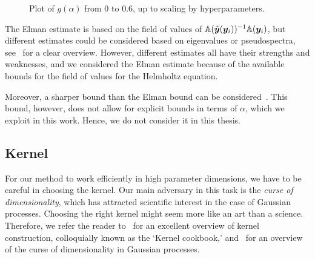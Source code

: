 \begin{figure}
    \centering
    \caption{Plot of $g(\alpha)$ from 0 to $0.6$, up to scaling by hyperparameters.}
    \label{fig:gplot}
\end{figure}

\begin{remark}
    The Elman estimate is based on the field of values of $\mathbb{A}(\hat{\bm{y}}({\bm{y}_i}))^{-1}\mathbb{A}({\bm{y}_i})$, but different estimates could be considered based on eigenvalues or pseudospectra, see~\cite{embree1999} for a clear overview.
    However, different estimates all have their strengths and weaknesses, and we considered the Elman estimate because of the available bounds for the field of values for the Helmholtz equation.

    Moreover, a sharper bound than the Elman bound can be considered~\cite{beckermann2005}.
    This bound, however, does not allow for explicit bounds in terms of $\alpha$, which we exploit in this work.
    Hence, we do not consider it in this thesis.
\end{remark}


\subsection{Kernel}\label{subsec:kernel}
For our method to work efficiently in high parameter dimensions, we have to be careful in choosing the kernel.
Our main adversary in this task is the \emph{curse of dimensionality}, which has attracted scientific interest in the case of Gaussian processes.
Choosing the right kernel might seem more like an art than a science.
Therefore, we refer the reader to~\cite[Chapter 2]{duvenaud2014} for an excellent overview of kernel construction, colloquially known as the `Kernel cookbook,' and~\cite{binois2022} for an overview of the curse of dimensionality in Gaussian processes.

